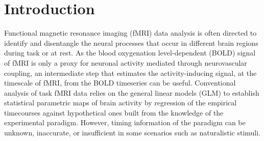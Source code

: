 
\section{Introduction}








Functional magnetic resonance imaging (fMRI) data analysis is often directed to identify and disentangle the neural processes that occur in different brain regions during task or at rest. As the blood oxygenation level-dependent (BOLD) signal of fMRI is only a proxy for neuronal activity mediated through neurovascular coupling, an intermediate step that estimates the activity-inducing signal, at the timescale of fMRI, from the BOLD timeseries can be useful. Conventional analysis of task fMRI data relies on the general linear models (GLM) to establish statistical parametric maps of brain activity by regression of the empirical timecourses against hypothetical ones built from the knowledge of the experimental paradigm. However, timing information of the paradigm can be unknown, inaccurate, or insufficient in some scenarios such as naturalistic stimuli.

